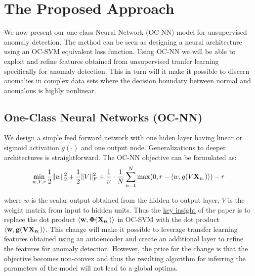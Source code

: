 \section{The Proposed Approach}
\label{sec:ocnn_method}

We now present our one-class Neural Network (OC-NN) model for unsupervised anomaly detection.
The method can be seen as designing a neural architecture using an  OC-SVM equivalent loss function.
Using OC-NN we will be able to exploit and refine features obtained from unsupervised tranfer learning specifically for anomaly
detection. This in turn will it make it possible to discern anomalies in complex data sets where the decision boundary between normal and anomalous
is highly nonlinear.
\vspace{-0.1cm}
\subsection{One-Class Neural Networks (OC-NN)}
\label{sec:oc-nn}
We design a simple feed forward network with one hiden layer having linear or sigmoid activation $g(\cdot )$ and one output node. Generalizations to deeper
architectures is straightforward. The OC-NN objective can be formulated as:
\begin{equation}
	\label{eqn:oc-nn}
	\min_{w, V, r} \frac{1}{2} \| w \|_{2}^2 + \frac{1}{2} \| V \|_F^2 + \frac{1}{\nu} \cdot \frac{1}{N} \sum_{n= 1}^N \max( 0, r - \langle w, g( V  \mathbf{X}_{n :} ) \rangle ) - r
\end{equation}

where $w$ is the scalar output obtained from the hidden to output layer,
$V$ is the weight matrix from input to hidden units.
Thus the \underline{key insight} of the paper is to replace the dot product $\mathbf{\langle w,\Phi(\mathbf{X}_{n :}) \rangle}$ in OC-SVM with the dot product $\mathbf{\langle w,g(V\mathbf{X}_{n :})\rangle}$. This change will make it possible to leverage transfer learning features obtained using an autoencoder and create an additional layer to refine
the features for anomaly detection. However, the price for the change is that the objective becomes non-convex and thus the resulting algorithm
for inferring the parameters of the model will not lead to a global optima.



